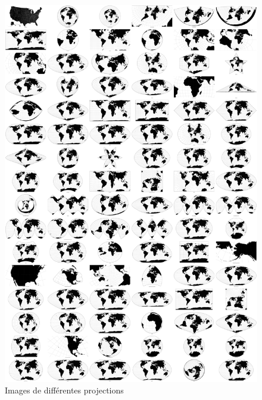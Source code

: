 \documentclass{article}
\begin{document}
\begin{figure}[H]
\centering
\includegraphics[scale=0.06]{projections.png}
\caption{Images de différentes projections}
\label{fig:projections}
\end{figure}
\end{document}
